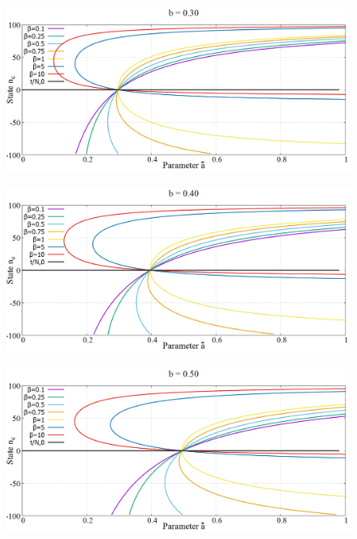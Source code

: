 \begin{figure}[h!]
 \centering
  \includegraphics[width=\linewidth]{images/appendix/phaseSpace/3.png}
\end{figure}
\newpage
\begin{figure}[h!]
 \centering
  \includegraphics[width=\linewidth]{images/appendix/phaseSpace/4.png}
\end{figure}
\newpage
\begin{figure}[h!]
 \centering
  \includegraphics[width=\linewidth]{images/appendix/phaseSpace/5.png}
\end{figure}

